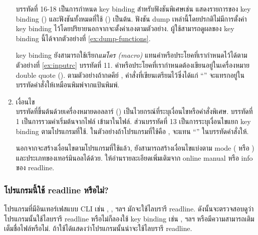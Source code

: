 \begin{thwbr}
\begin{enumerate}
บรรทัดที่ 16-18 เป็นการกำหนด key binding สำหรับฟังชันพิเศษเช่น แสดงรายการของ key binding () และฟังชันทั้งหมดที่ใช้ () เป็นต้น. ฟังชัน dump เหล่านี้โดยปรกติไม่มีการตั้งค่า key binding ไว้โดยปริยายนอกจากจะตั้งค่าเองตามตัวอย่าง. ผู้ใช้สามารถดูผลของ key binding นี้ได้จากตัวอย่างที่ \ref{ex:dump-functions}.
\begin{MyExample}\label{ex:dump-functions}
\begin{MyEx}
$ \kk{Esc} \kk{x} \kk{f}
                                                              
abort can be found on "\bs{}C-g", "\bs{}C-x\bs{}C-g", "\bs{}M-\bs{}C-g".
accept-line can be found on "\bs{}C-j", "\bs{}C-m".
alias-expand-line is not bound to any keys
arrow-key-prefix is not bound to any keys
backward-byte is not bound to any keys
backward-char can be found on "\bs{}C-b", "\bs{}M-[D".
...
\end{MyEx}
\end{MyExample}%


key binding ยังสามารถใช้เรียก\emph{แมโคร (macro)} แทนคำหรือประโยคที่เรากำหนดไว้ได้ตามตัวอย่างที่ \ref{ex:inputrc} บรรทัดที่ 11. คำหรือประโยคที่เรากำหนดต้องเขียนอยู่ในเครื่องหมาย double quote (\dq). ตามตัวอย่างถ้ากดคีย์ , คำสั่งที่เขียนเตรียมไว้ซึ่งได้แก่ ``'' จะแทรกอยู่ในบรรทัดคำสั่งให้เหมือนพิมพ์จากแป้นพิมพ์.


\item เงื่อนไข\\
บรรทัดที่ขึ้นต้นด้วยเครื่องหมายดอลลาร์ (\cmd{\$}) เป็นไวยกรณ์ที่ระบุเงื่อนไขหรือคำสั่งพิเศษ. บรรทัดที่ 1 เป็นการรวมค่าเริ่มต้นจากไฟล์  เข้ามาในไฟล์. ส่วนบรรทัดที่ 13 เป็นการระบุเงื่อนไขแยก key binding ตามโปรแกรมที่ใช้. ในตัวอย่างถ้าโปรแกรมที่ใช้คือ ,  จะแทน ``'' ในบรรทัดคำสั่งให้.

นอกจากจะสร้างเงื่อนไขตามโปรแกรมที่ใช้แล้ว, ยังสามารถสร้างเงื่อนไขแบ่งตาม mode ( หรือ ) และประเภทของเทอร์มินอลได้ด้วย. ให้อ่านรายละเอียดเพิ่มเติมจาก online manual หรือ info ของ readline.
\end{enumerate}


\subsubsection{โปรแกรมนี้ใช้ readline หรือไม่?}
โปรแกรมที่มีอินเทอร์เฟสแบบ CLI เช่น , ,  ฯลฯ มักจะใช้ไลบรารี readline. ดังนั้นจะตรวจสอบดูว่าโปรแกรมนั้นใช้ไลบรารี readline หรือไม่ก็ลองใช้ key binding เช่น ,  ฯลฯ หรือมีความสามารถเติมเต็มชื่อไฟล์หรือไม่. ถ้าใช้ได้แสดงว่าโปรแกรมนั้นน่าจะใช้ไลบรารี readline.


\end{thwbr}
